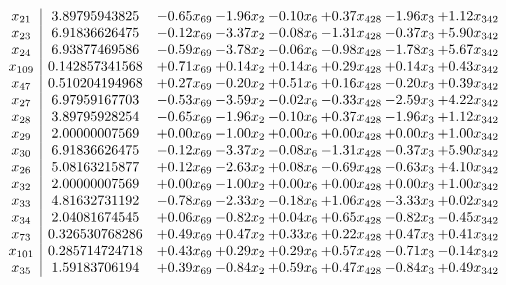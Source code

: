 \documentclass[8pt]{article}
\begin{document}
\[\begin{array}{c| c c@{\hskip 2pt} c@{\hskip 2pt} c@{\hskip 2pt} c@{\hskip 2pt} c@{\hskip 2pt} c@{\hskip 2pt} }
 x_{21}   &  3.89795943825 & -0.65 x_{69} & -1.96 x_{2} & -0.10 x_{6} & +  0.37 x_{428} & -1.96 x_{3} & +  1.12 x_{342}\\
 x_{23}   &  6.91836626475 & -0.12 x_{69} & -3.37 x_{2} & -0.08 x_{6} & -1.31 x_{428} & -0.37 x_{3} & +  5.90 x_{342}\\
 x_{24}   &  6.93877469586 & -0.59 x_{69} & -3.78 x_{2} & -0.06 x_{6} & -0.98 x_{428} & -1.78 x_{3} & +  5.67 x_{342}\\
 x_{109}   &  0.142857341568 & +  0.71 x_{69} & +  0.14 x_{2} & +  0.14 x_{6} & +  0.29 x_{428} & +  0.14 x_{3} & +  0.43 x_{342}\\
 x_{47}   &  0.510204194968 & +  0.27 x_{69} & -0.20 x_{2} & +  0.51 x_{6} & +  0.16 x_{428} & -0.20 x_{3} & +  0.39 x_{342}\\
 x_{27}   &  6.97959167703 & -0.53 x_{69} & -3.59 x_{2} & -0.02 x_{6} & -0.33 x_{428} & -2.59 x_{3} & +  4.22 x_{342}\\
 x_{28}   &  3.89795928254 & -0.65 x_{69} & -1.96 x_{2} & -0.10 x_{6} & +  0.37 x_{428} & -1.96 x_{3} & +  1.12 x_{342}\\
 x_{29}   &  2.00000007569 & +  0.00 x_{69} & -1.00 x_{2} & +  0.00 x_{6} & +  0.00 x_{428} & +  0.00 x_{3} & +  1.00 x_{342}\\
 x_{30}   &  6.91836626475 & -0.12 x_{69} & -3.37 x_{2} & -0.08 x_{6} & -1.31 x_{428} & -0.37 x_{3} & +  5.90 x_{342}\\
 x_{26}   &  5.08163215877 & +  0.12 x_{69} & -2.63 x_{2} & +  0.08 x_{6} & -0.69 x_{428} & -0.63 x_{3} & +  4.10 x_{342}\\
 x_{32}   &  2.00000007569 & +  0.00 x_{69} & -1.00 x_{2} & +  0.00 x_{6} & +  0.00 x_{428} & +  0.00 x_{3} & +  1.00 x_{342}\\
 x_{33}   &  4.81632731192 & -0.78 x_{69} & -2.33 x_{2} & -0.18 x_{6} & +  1.06 x_{428} & -3.33 x_{3} & +  0.02 x_{342}\\
 x_{34}   &  2.04081674545 & +  0.06 x_{69} & -0.82 x_{2} & +  0.04 x_{6} & +  0.65 x_{428} & -0.82 x_{3} & -0.45 x_{342}\\
 x_{73}   &  0.326530768286 & +  0.49 x_{69} & +  0.47 x_{2} & +  0.33 x_{6} & +  0.22 x_{428} & +  0.47 x_{3} & +  0.41 x_{342}\\
 x_{101}   &  0.285714724718 & +  0.43 x_{69} & +  0.29 x_{2} & +  0.29 x_{6} & +  0.57 x_{428} & -0.71 x_{3} & -0.14 x_{342}\\
 x_{35}   &  1.59183706194 & +  0.39 x_{69} & -0.84 x_{2} & +  0.59 x_{6} & +  0.47 x_{428} & -0.84 x_{3} & +  0.49 x_{342}\\

\end{array}\]
\end{document}
